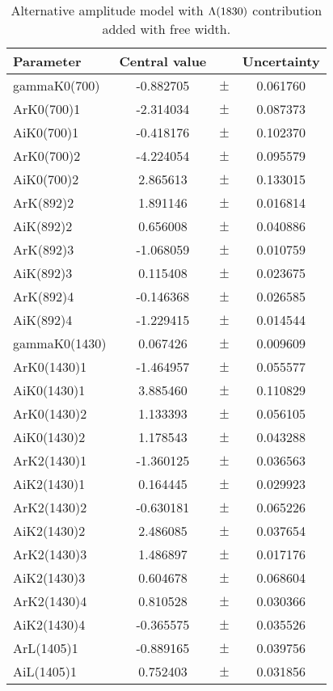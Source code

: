\clearpage

\begin{table}
\centering
\caption{Alternative amplitude model with ${\Lambda}(1830)$ contribution added with free width.}
\begin{tiny}
\begin{tabular}{lccc}
\toprule
Parameter & Central value & & Uncertainty\\
\midrule 
gammaK0(700) & -0.882705 & $\pm$ & 0.061760 \\
ArK0(700)1 & -2.314034 & $\pm$ & 0.087373 \\
AiK0(700)1 & -0.418176 & $\pm$ & 0.102370 \\
ArK0(700)2 & -4.224054 & $\pm$ & 0.095579 \\
AiK0(700)2 & 2.865613 & $\pm$ & 0.133015 \\
ArK(892)2 & 1.891146 & $\pm$ & 0.016814 \\
AiK(892)2 & 0.656008 & $\pm$ & 0.040886 \\
ArK(892)3 & -1.068059 & $\pm$ & 0.010759 \\
AiK(892)3 & 0.115408 & $\pm$ & 0.023675 \\
ArK(892)4 & -0.146368 & $\pm$ & 0.026585 \\
AiK(892)4 & -1.229415 & $\pm$ & 0.014544 \\
gammaK0(1430) & 0.067426 & $\pm$ & 0.009609 \\
ArK0(1430)1 & -1.464957 & $\pm$ & 0.055577 \\
AiK0(1430)1 & 3.885460 & $\pm$ & 0.110829 \\
ArK0(1430)2 & 1.133393 & $\pm$ & 0.056105 \\
AiK0(1430)2 & 1.178543 & $\pm$ & 0.043288 \\
ArK2(1430)1 & -1.360125 & $\pm$ & 0.036563 \\
AiK2(1430)1 & 0.164445 & $\pm$ & 0.029923 \\
ArK2(1430)2 & -0.630181 & $\pm$ & 0.065226 \\
AiK2(1430)2 & 2.486085 & $\pm$ & 0.037654 \\
ArK2(1430)3 & 1.486897 & $\pm$ & 0.017176 \\
AiK2(1430)3 & 0.604678 & $\pm$ & 0.068604 \\
ArK2(1430)4 & 0.810528 & $\pm$ & 0.030366 \\
AiK2(1430)4 & -0.365575 & $\pm$ & 0.035526 \\
ArL(1405)1 & -0.889165 & $\pm$ & 0.039756 \\
AiL(1405)1 & 0.752403 & $\pm$ & 0.031856 \\

\end{tabular}
\end{tiny}
\end{table}
